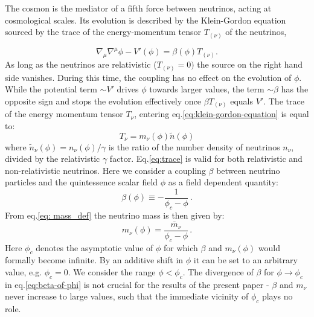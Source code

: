 The cosmon is the mediator of a fifth force between neutrinos, acting
at cosmological scales. Its evolution is described by the Klein-Gordon
equation sourced by the trace of the energy-momentum tensor $T_{(\nu)}$
of the neutrinos,

\begin{equation}
\nabla_{\mu}\nabla^{\mu}\phi-V'(\phi)=\beta(\phi)T_{(\nu)}.\label{eq:klein-gordon-equation}
\end{equation}
As long as the neutrinos are relativistic ($T_{(\nu)}=0)$ the source
on the right hand side vanishes. During this time, the coupling has
no effect on the evolution of $\phi$. While the potential term $\sim V'$
drives $\phi$ towards larger values, the term $\sim\beta$ has the
opposite sign and stops the evolution effectively once $\beta T_{(\nu)}$
equals $V'$. The trace of the energy momentum tensor $T_{\nu}$,
entering eq.\ref{eq:klein-gordon-equation} is equal to: 
\begin{equation}
T_{\nu}=m_{\nu}(\phi)\tilde{n}(\phi)\label{eq:trace}
\end{equation}
where $\tilde{n}_{\nu}(\phi)=n_{\nu}(\phi)/\gamma$ is the ratio of
the number density of neutrinos $n_{\nu}$, divided by the relativistic
$\gamma$ factor. Eq.\ref{eq:trace} is valid for both relativistic
and non-relativistic neutrinos. Here we consider a coupling $\beta$
between neutrino particles and the quintessence scalar field $\phi$
as a field dependent quantity: 
\begin{equation}
\beta(\phi)\equiv-\frac{1}{\phi_{c}-\phi}\,.\label{eq:beta-of-phi}
\end{equation}
From eq.\ref{eq: mass_def} the neutrino mass is then given
by: 
\begin{equation}
m_{\nu}(\phi)=\frac{\bar{m}_{\nu}}{\phi_{c}-\phi}\,.\label{eq:mnu-of-phi}
\end{equation}
Here $\phi_{c}$ denotes the asymptotic value of $\phi$ for which
$\beta$ and $m_{\nu}(\phi)$ would formally become infinite. By an
additive shift in $\phi$ it can be set to an arbitrary value, e.g.
$\phi_{c}=0$. We consider the range $\phi<\phi_{c}$. The divergence
of $\beta$ for $\phi\rightarrow\phi_{c}$ in eq.\ref{eq:beta-of-phi}
is not crucial for the results of the present paper - $\beta$ and
$m_{\nu}$ never increase to large values, such that the immediate
vicinity of $\phi_{c}$ plays no role.

